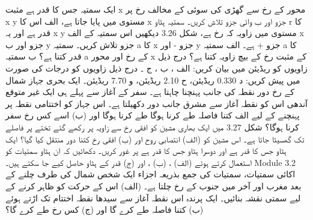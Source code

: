 
 ایک سمتیہ جس کا قدر     ہے مثبت x محور کے رخ سے گھڑی کی سوئی کے مخالف رخ     پر x y مستوی میں پایا جاتا ہے،  الف اس کا x جزو اور ب  وائی جزو تلاش کریں۔   
 سمتیہ ہٹاو r کا قدر     ہے اور یہ x y  مستوی میں زاویہ    کہ رخ ہے، شکل 3.26 دیکھیں اس سمتیہ کے الف x جزو اور  ب y جزو تلاش کریں۔  
  سمتیہ a کا x جزو -    اور y جزو +    ہے۔  الف سمتیہ a کا قدر کتنا ہے؟  ب سمتیہ a کے رخ اور محور x کے مثبت رخ کے بیچ زاویہ کتنا ہے؟   
  درج ذیل زاویوں کو ریڈیئن میں بیان کریں: الف   ، ب  ، ج  ۔ درج ذیل زاویوں کو درجات  کی صورت میں پیش کریں: د 0.330 ریڈیئن،  ح 2.10 ریڈیئن، و 7.70 ریڈیئن۔  
  ایک بحری  جہاز شمال کے رخ    دور نقطہ کی جانب پہنچنا چاہتا ہے۔ سفر کے آغاز سے پہلے ہی ایک غیر متوقع آندھی اس کو نقطہ آغاز سے مشرق جانب     دور دکھیلتا ہے۔ اس جہاز کو اختتامی نقطہ پر پہنچنے کے لیے الف کتنا فاصلہ طے کرنا ہوگا طے کرنا ہوگا اور (ب) اسے کس رخ سفر کرنا ہوگا؟  
 شکل 3.27 میں ایک بھاری مشین کو افقی  رخ سے زاویہ   پر رکھے گئے تختے پر   فاصلے تک گھسیٹا جاتا ہے۔ اس مشین کو (الف) انتصابی روح اور  (ب)  افقی  رخ کتنا دور منتقل کیا گیا؟   
 ایک ہٹاو جس کا قدر    ہے اور دوسرا ہٹاو جس کا قدر    ہے پر غور کریں۔ دکھائیں کہ ان ہٹاو سمتیات کو استعمال کرتے ہوئے  (الف)    ، (ب)   ، اور (ج)  قدر کے ہٹاو حاصل کیے جا سکتے ہیں۔ Module 3.2  اکائی سمتیات، سمتیات کی جمع بذریعہ اجزاء   
 ایک شخص   شمال کی طرف چلنے کے بعد   مغرب اور آخر  میں    جنوب کے رخ چلتا ہے۔ (الف) اس کے حرکت کو ظاہر کرنے کے لیے سمتی نقشہ بنائیں۔ ایک پرندہ اس نقطہ آغاز سے سیدھا نقطہ اختتام تک اڑتے ہوئے  (ب) کتنا فاصلہ طے کرے گا اور  (ج) کس رخ طے کرے گا؟   
